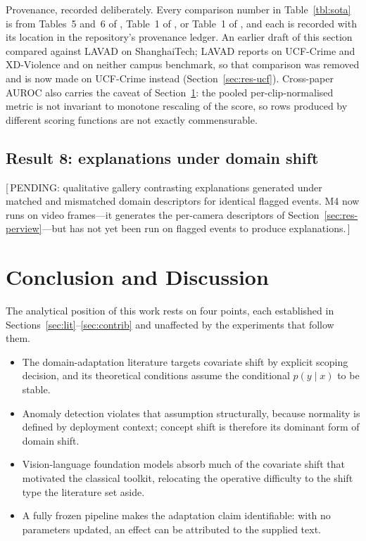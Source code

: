 \documentclass[a4paper,fleqn]{cas-sc}
\newcommand{\pending}[1]{{\sffamily\color{pendingcol}[\,PENDING: #1\,]}}
\newcommand{\wnote}[1]{{\color{notecol}#1}}
\begin{document}
\wnote{Provenance, recorded deliberately. Every comparison number in
Table~\ref{tbl:sota} is from Tables~5 and~6 of \citet{anyanomaly2025}, Table~1
of \citet{zanella2024lavad}, or Table~1 of \citet{liu2018shanghaitech}, and each
is recorded with its location in the repository's provenance ledger. An earlier draft of this section compared
against LAVAD \citep{zanella2024lavad} on ShanghaiTech; LAVAD reports on
UCF-Crime and XD-Violence and on neither campus benchmark, so that comparison
was removed and is now made on UCF-Crime instead (Section~\ref{sec:res-ucf}).
Cross-paper AUROC also carries the caveat of
Section~\ref{sec:conclusion}: the pooled per-clip-normalised metric is not
invariant to monotone rescaling of the score, so rows produced by different
scoring functions are not exactly commensurable.}

\subsection{Result 8: explanations under domain shift}
\pending{qualitative gallery contrasting explanations generated under matched and
mismatched domain descriptors for identical flagged events. M4 now runs on video
frames---it generates the per-camera descriptors of
Section~\ref{sec:res-perview}---but has not yet been run on flagged events to
produce explanations.}

\section{Conclusion and Discussion}
\label{sec:conclusion}

The analytical position of this work rests on four points, each established in
Sections~\ref{sec:lit}--\ref{sec:contrib} and unaffected by the experiments that
follow them.

\begin{itemize}
  \item The domain-adaptation literature targets covariate shift by explicit
        scoping decision, and its theoretical conditions assume the conditional
        $p(y\mid x)$ to be stable.
  \item Anomaly detection violates that assumption structurally, because
        normality is defined by deployment context; concept shift is therefore
        its dominant form of domain shift.
  \item Vision-language foundation models absorb much of the covariate shift that
        motivated the classical toolkit, relocating the operative difficulty to
        the shift type the literature set aside.
  \item A fully frozen pipeline makes the adaptation claim identifiable: with no
        parameters updated, an effect can be attributed to the supplied text.
\end{itemize}
\end{document}
